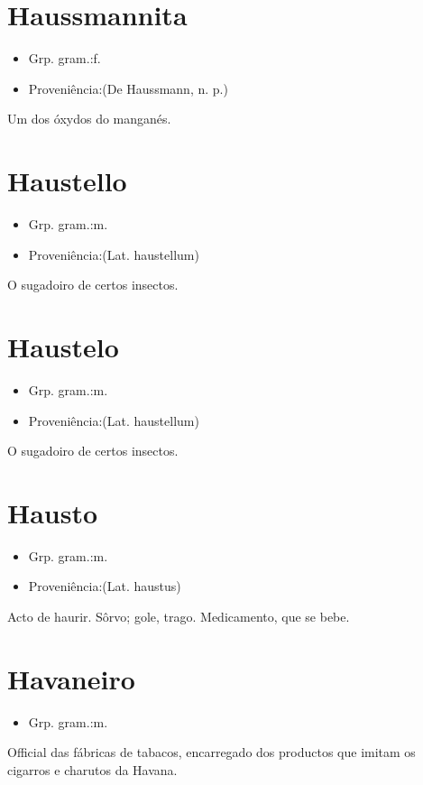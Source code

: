 \documentclass{article}
\begin{document}
\section{Haussmannita}
\begin{itemize}
\item {Grp. gram.:f.}
\end{itemize}
\begin{itemize}
\item {Proveniência:(De \textunderscore Haussmann\textunderscore , n. p.)}
\end{itemize}
Um dos óxydos do manganés.
\section{Haustello}
\begin{itemize}
\item {Grp. gram.:m.}
\end{itemize}
\begin{itemize}
\item {Proveniência:(Lat. \textunderscore haustellum\textunderscore )}
\end{itemize}
O sugadoiro de certos insectos.
\section{Haustelo}
\begin{itemize}
\item {Grp. gram.:m.}
\end{itemize}
\begin{itemize}
\item {Proveniência:(Lat. \textunderscore haustellum\textunderscore )}
\end{itemize}
O sugadoiro de certos insectos.
\section{Hausto}
\begin{itemize}
\item {Grp. gram.:m.}
\end{itemize}
\begin{itemize}
\item {Proveniência:(Lat. \textunderscore haustus\textunderscore )}
\end{itemize}
Acto de haurir.
Sôrvo; gole, trago.
Medicamento, que se bebe.
\section{Havaneiro}
\begin{itemize}
\item {Grp. gram.:m.}
\end{itemize}
Official das fábricas de tabacos, encarregado dos productos que imitam os cigarros e charutos da Havana.
\end{document}
